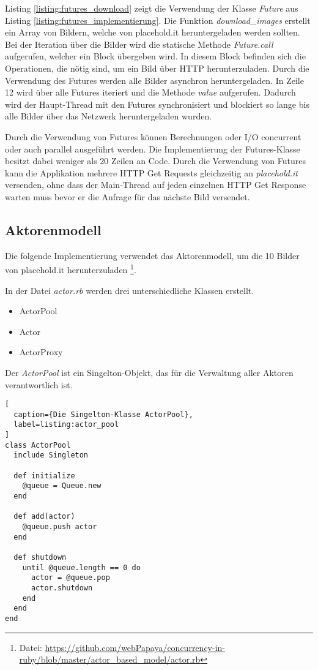 Listing \ref{listing:futures_download} zeigt die Verwendung der Klasse \emph{Future} aus Listing \ref{listing:futures_implementierung}. Die Funktion \emph{download\_images} erstellt ein Array von Bildern, welche von placehold.it heruntergeladen werden sollten. Bei der Iteration über die Bilder wird die statische Methode \emph{Future.call} aufgerufen, welcher ein Block übergeben wird. In diesem Block befinden sich die Operationen, die nötig sind, um ein Bild über HTTP herunterzuladen. Durch die Verwendung des Futures werden alle Bilder asynchron heruntergeladen. In Zeile 12 wird über alle Futures iteriert und die Methode \emph{value} aufgerufen. Dadurch wird der Haupt-Thread mit den Futures synchronisiert und blockiert so lange bis alle Bilder über das Netzwerk heruntergeladen wurden. 

Durch die Verwendung von Futures können Berechnungen oder I/O concurrent oder auch parallel ausgeführt werden. Die Implementierung der Futures-Klasse besitzt dabei weniger als 20 Zeilen an Code. Durch die Verwendung von Futures kann die Applikation mehrere HTTP Get Requests gleichzeitig an \emph{placehold.it} versenden, ohne dass der Main-Thread auf jeden einzelnen HTTP Get Response warten muss bevor er die Anfrage für das nächste Bild versendet. 

\subsection{Aktorenmodell}

Die folgende Implementierung verwendet das Aktorenmodell, um die 10 Bilder von placehold.it herunterzuladen \footnote{Datei: \url{https://github.com/webPapaya/concurrency-in-ruby/blob/master/actor_based_model/actor.rb}}.

In der Datei \emph{actor.rb} werden drei unterschiedliche Klassen erstellt.

\begin{itemize}
  \item ActorPool
  \item Actor
  \item ActorProxy
\end{itemize}

Der \emph{ActorPool} ist ein Singelton-Objekt, das für die Verwaltung aller Aktoren verantwortlich ist. 

\begin{lstlisting}[
  caption={Die Singelton-Klasse ActorPool},
  label=listing:actor_pool
]
class ActorPool
  include Singleton

  def initialize
    @queue = Queue.new
  end

  def add(actor)
    @queue.push actor
  end

  def shutdown
    until @queue.length == 0 do
      actor = @queue.pop
      actor.shutdown
    end
  end
end
\end{lstlisting}

